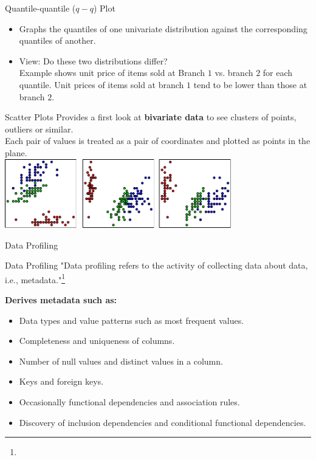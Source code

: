 \begin{frame}{Quantile-quantile ($q-q$) Plot}
	\begin{itemize}
		\item Graphs the quantiles of one univariate distribution against the corresponding quantiles of another.
		\item View: Do these two distributions differ?\\
		      Example shows unit price of items sold at Branch $1$ vs. branch $2$ for each quantile.  Unit prices of items sold at branch $1$ tend to be lower than those at branch $2$.
	\end{itemize}\vspace{0.5cm}
	\centering
\end{frame}

\begin{frame}{Scatter Plots}
	Provides a first look at \textbf{bivariate data} to see clusters of points, outliers or similar.\\
	Each pair of values is treated as a pair of coordinates and plotted as points in the plane.\\[0.5cm]
	\centering
	\includegraphics[height=3cm]{img/scatterplot.pdf}
\end{frame}

\begin{frame}{Data Profiling}
	\begin{block}{Data Profiling}
		"Data profiling refers to the activity of collecting data about data, i.e., metadata."\footnote{}
	\end{block}

	\textbf{Derives metadata such as:}
	\begin{itemize}
		\item Data types and value patterns such as most frequent values.
		\item Completeness and uniqueness of columns.
		\item Number of null values and distinct values in a column.
		\item Keys and foreign keys.
		\item Occasionally functional dependencies and association rules.
		\item Discovery of inclusion dependencies and conditional functional dependencies.
	\end{itemize}
\end{frame}
